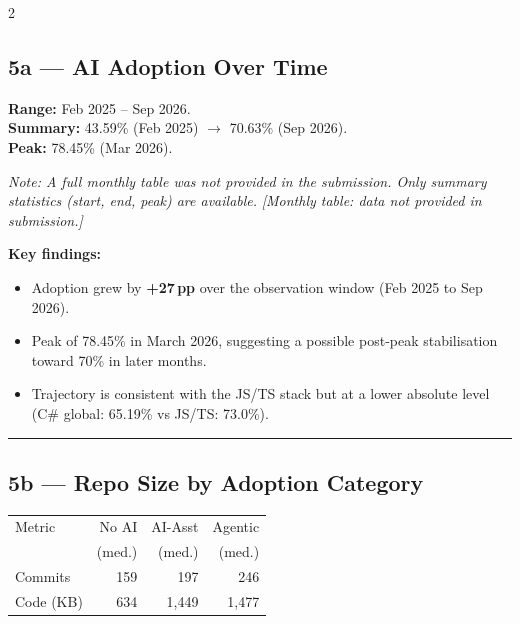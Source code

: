 \documentclass[10pt,a4paper]{article}
\begin{document}
\begin{multicols}{2}
\footnotesize

\subsection*{5a --- AI Adoption Over Time}
\textbf{Range:} Feb 2025 -- Sep 2026.\\
\textbf{Summary:} 43.59\% (Feb 2025) $\to$ 70.63\% (Sep 2026).\\
\textbf{Peak:} 78.45\% (Mar 2026).

\vspace{3pt}
\textit{Note: A full monthly table was not provided in the submission. Only summary
statistics (start, end, peak) are available.}
\textit{\small [Monthly table: data not provided in submission.]}

\vspace{3pt}
\textbf{Key findings:}
\begin{itemize}\setlength\itemsep{0pt}
  \item Adoption grew by \textbf{+27\,pp} over the observation window
        (Feb 2025 to Sep 2026).
  \item Peak of 78.45\% in March 2026, suggesting a possible
        post-peak stabilisation toward 70\% in later months.
  \item Trajectory is consistent with the JS/TS stack but at a lower
        absolute level (C\# global: 65.19\% vs JS/TS: 73.0\%).
\end{itemize}

\vspace{3pt}
\hrule
\vspace{3pt}

\subsection*{5b --- Repo Size by Adoption Category}

\vspace{2pt}
\begin{tabular}{@{}lrrr@{}}
\toprule
Metric & No AI & AI-Asst & Agentic \\
       & (med.)& (med.)  & (med.)  \\
\midrule
Commits     & 159 & 197 & 246 \\
Code (KB)   & 634 & 1,449 & 1,477 \\
\bottomrule
\end{tabular}


\end{multicols}
\end{document}
